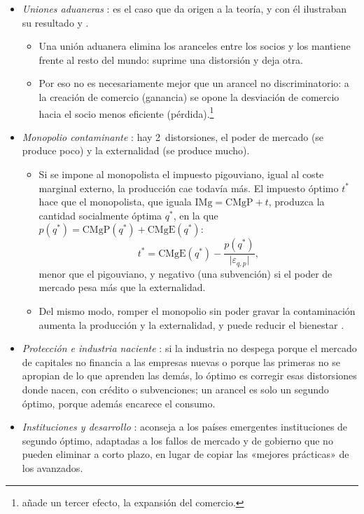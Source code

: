 \documentclass[11pt]{article}
\begin{document}
\begin{itemize}
\item \emph{Uniones aduaneras} : es el caso que da origen a la teoría, y con él ilustraban su resultado  y .
  \begin{itemize}
  \item Una unión aduanera elimina los aranceles entre los socios y los mantiene frente al resto del mundo: suprime una distorsión y deja otra.
  \item Por eso no es necesariamente mejor que un arancel no discriminatorio: a la creación de comercio (ganancia) se opone la desviación de comercio hacia el socio menos eficiente (pérdida)\nocite{Viner1950Customs,Lipsey1957Theory}.\footnote{\textcite{Meade1955Customs} añade un tercer efecto, la expansión del comercio.}
  \end{itemize}
\item \emph{Monopolio contaminante}  : hay 2~distorsiones, el poder de mercado (se produce poco) y la externalidad (se produce mucho).
  \begin{itemize}
  \item Si se impone al monopolista el impuesto pigouviano, igual al coste marginal externo, la producción cae todavía más. El impuesto óptimo $t^*$ hace que el monopolista, que iguala $\mathrm{IMg}=\mathrm{CMgP}+t$, produzca la cantidad socialmente óptima $q^*$, en la que $p(q^*)=\mathrm{CMgP}(q^*)+\mathrm{CMgE}(q^*)$:
  $$t^*=\mathrm{CMgE}(q^*)-\frac{p(q^*)}{\lvert\varepsilon_{q,p}\rvert},$$
    menor que el pigouviano, y negativo (una subvención) si el poder de mercado pesa más que la externalidad\nocite{Buchanan1969External,Barnett1980Pigouvian}.
  \item Del mismo modo, romper el monopolio sin poder gravar la contaminación aumenta la producción y la externalidad, y puede reducir el bienestar .
  \end{itemize}
\item \emph{Protección e industria naciente} : si la industria no despega porque el mercado de capitales no financia a las empresas nuevas o porque las primeras no se apropian de lo que aprenden las demás, lo óptimo es corregir esas distorsiones donde nacen, con crédito o subvenciones; un arancel es solo un segundo óptimo, porque además encarece el consumo\nocite{BhagwatiRamaswami1963Domestic}.
\item \emph{Instituciones y desarrollo} : \textcite{Rodrik2008Second} aconseja a los países emergentes instituciones de segundo óptimo, adaptadas a los fallos de mercado y de gobierno que no pueden eliminar a corto plazo, en lugar de copiar las «mejores prácticas» de los avanzados.

\end{itemize}
\end{document}
